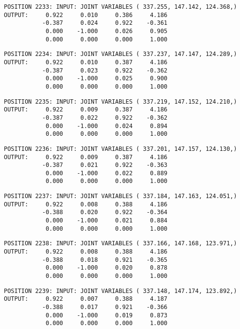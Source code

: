 \begin{verbatim}
POSITION 2233: INPUT: JOINT VARIABLES ( 337.255, 147.142, 124.368,)
OUTPUT:     0.922     0.010     0.386     4.186
           -0.387     0.024     0.922    -0.361
            0.000    -1.000     0.026     0.905
            0.000     0.000     0.000     1.000
\end{verbatim} \pagebreak[1]\begin{verbatim}
POSITION 2234: INPUT: JOINT VARIABLES ( 337.237, 147.147, 124.289,)
OUTPUT:     0.922     0.010     0.387     4.186
           -0.387     0.023     0.922    -0.362
            0.000    -1.000     0.025     0.900
            0.000     0.000     0.000     1.000
\end{verbatim} \pagebreak[1]\begin{verbatim}
POSITION 2235: INPUT: JOINT VARIABLES ( 337.219, 147.152, 124.210,)
OUTPUT:     0.922     0.009     0.387     4.186
           -0.387     0.022     0.922    -0.362
            0.000    -1.000     0.024     0.894
            0.000     0.000     0.000     1.000
\end{verbatim} \pagebreak[1]\begin{verbatim}
POSITION 2236: INPUT: JOINT VARIABLES ( 337.201, 147.157, 124.130,)
OUTPUT:     0.922     0.009     0.387     4.186
           -0.387     0.021     0.922    -0.363
            0.000    -1.000     0.022     0.889
            0.000     0.000     0.000     1.000
\end{verbatim} \pagebreak[1]\begin{verbatim}
POSITION 2237: INPUT: JOINT VARIABLES ( 337.184, 147.163, 124.051,)
OUTPUT:     0.922     0.008     0.388     4.186
           -0.388     0.020     0.922    -0.364
            0.000    -1.000     0.021     0.884
            0.000     0.000     0.000     1.000
\end{verbatim} \pagebreak[1]\begin{verbatim}
POSITION 2238: INPUT: JOINT VARIABLES ( 337.166, 147.168, 123.971,)
OUTPUT:     0.922     0.008     0.388     4.186
           -0.388     0.018     0.921    -0.365
            0.000    -1.000     0.020     0.878
            0.000     0.000     0.000     1.000
\end{verbatim} \pagebreak[1]\begin{verbatim}
POSITION 2239: INPUT: JOINT VARIABLES ( 337.148, 147.174, 123.892,)
OUTPUT:     0.922     0.007     0.388     4.187
           -0.388     0.017     0.921    -0.366
            0.000    -1.000     0.019     0.873
            0.000     0.000     0.000     1.000
\end{verbatim} \pagebreak[1]\begin{verbatim}

\end{verbatim}
